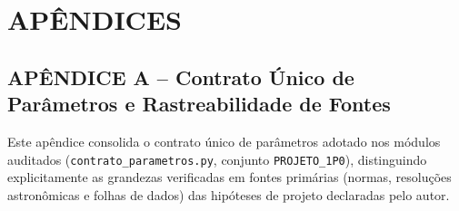 
\newpage
{}
\section*{APÊNDICES}

\subsection*{APÊNDICE A -- Contrato Único de Parâmetros e Rastreabilidade de Fontes}

Este apêndice consolida o contrato único de parâmetros adotado nos módulos auditados (\texttt{contrato\_parametros.py}, conjunto \texttt{PROJETO\_1P0}), distinguindo explicitamente as grandezas verificadas em fontes primárias (normas, resoluções astronômicas e folhas de dados) das hipóteses de projeto declaradas pelo autor.

